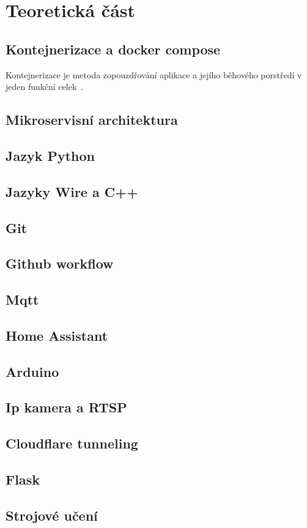 ﻿\chapter{Teoretická část}
\section{Kontejnerizace a docker compose}
Kontejnerizace je metoda zopouzdřování aplikace a jejího běhového porstředí v jeden funkční celek~\autocite{docker-docs}.
\section{Mikroservisní architektura}
\section{Jazyk Python}
\section{Jazyky Wire a C++ }
\section{Git}
\section{Github workflow}
\section{Mqtt}
\section{Home Assistant}
\section{Arduino}
\section{Ip kamera a RTSP}
\section{Cloudflare tunneling}
\section{Flask}
\section{Strojové učení}
